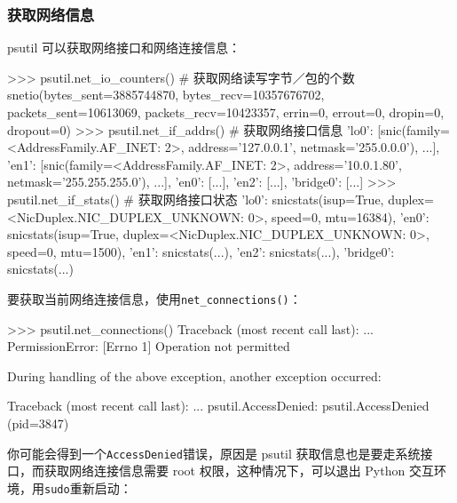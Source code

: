 \hypertarget{ux83b7ux53d6ux7f51ux7edcux4fe1ux606f}{%
\subsubsection{获取网络信息}\label{ux83b7ux53d6ux7f51ux7edcux4fe1ux606f}}

psutil 可以获取网络接口和网络连接信息：

\begin{pythoncode}
>>> psutil.net_io_counters() # 获取网络读写字节／包的个数
snetio(bytes_sent=3885744870, bytes_recv=10357676702, packets_sent=10613069, packets_recv=10423357, errin=0, errout=0, dropin=0, dropout=0)
>>> psutil.net_if_addrs() # 获取网络接口信息
{
  'lo0': [snic(family=<AddressFamily.AF_INET: 2>, address='127.0.0.1', netmask='255.0.0.0'), ...],
  'en1': [snic(family=<AddressFamily.AF_INET: 2>, address='10.0.1.80', netmask='255.255.255.0'), ...],
  'en0': [...],
  'en2': [...],
  'bridge0': [...]
}
>>> psutil.net_if_stats() # 获取网络接口状态
{
  'lo0': snicstats(isup=True, duplex=<NicDuplex.NIC_DUPLEX_UNKNOWN: 0>, speed=0, mtu=16384),
  'en0': snicstats(isup=True, duplex=<NicDuplex.NIC_DUPLEX_UNKNOWN: 0>, speed=0, mtu=1500),
  'en1': snicstats(...),
  'en2': snicstats(...),
  'bridge0': snicstats(...)
}
\end{pythoncode}

要获取当前网络连接信息，使用\texttt{net\_connections()}：

\begin{pythoncode}
>>> psutil.net_connections()
Traceback (most recent call last):
  ...
PermissionError: [Errno 1] Operation not permitted

During handling of the above exception, another exception occurred:

Traceback (most recent call last):
  ...
psutil.AccessDenied: psutil.AccessDenied (pid=3847)
\end{pythoncode}

你可能会得到一个\texttt{AccessDenied}错误，原因是 psutil
获取信息也是要走系统接口，而获取网络连接信息需要 root
权限，这种情况下，可以退出 Python 交互环境，用\texttt{sudo}重新启动：

